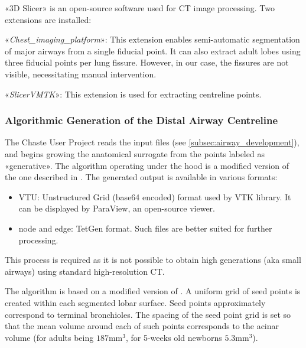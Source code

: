 «3D Slicer» is an open-source software used for CT image processing.
Two extensions are installed:

\begin{description}
\item «\emph{Chest\_imaging\_platform}»: This extension enables
  semi-automatic segmentation of major airways from a single fiducial
  point.  It can also extract adult lobes using three fiducial points
  per lung fissure. However, in our case, the fissures are not
  visible, necessitating manual intervention.
\item «\emph{SlicerVMTK}»: This extension is used for extracting
  centreline points.
\end{description}

\subsubsection{Algorithmic Generation of the Distal Airway Centreline}
\label{subsubsec:statistical_generation}

The Chaste User Project reads the input files
(see \cref{subsec:airway_development}), and begins growing the
anatomical surrogate from the points labeled as «generative».  The
algorithm operating under the hood is a modified version of the one
described in \cite{tawhai2000,bordas2015}.  The generated output is
available in various formats:

\begin{itemize}
\item VTU: Unstructured Grid (base64 encoded) format used by VTK
  library.  It can be displayed by ParaView, an open-source viewer.
\item node and edge: TetGen format.  Such files are better suited for
  further processing.
\end{itemize}


This process is required as it is not possible to obtain high
generations (aka small airways) using standard high-resolution
CT\cite{bordas2015}.

The algorithm is based on a modified version of \textcite{tawhai2000}.
A uniform grid of seed points is created within each segmented lobar
surface. Seed points approximately correspond to terminal bronchioles.
The spacing of the seed point grid is set so that the mean volume around
each of such points corresponds to the acinar volume (for adults being
$187\text{mm}^3$, for 5-weeks old newborns $5.3\text{mm}^3$).


